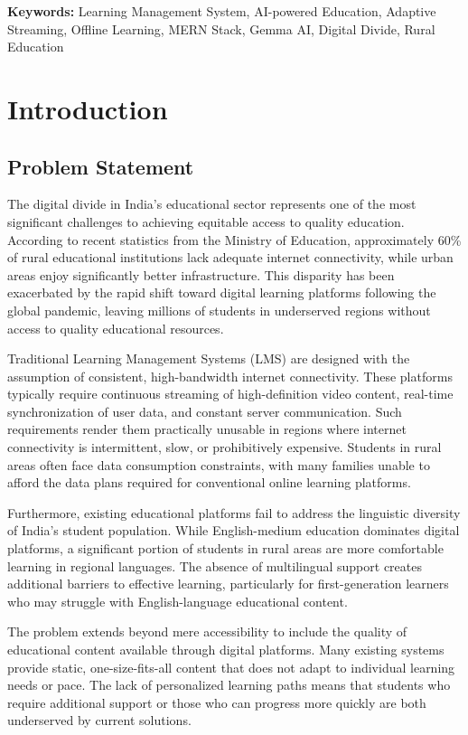 \documentclass[12pt,a4paper]{report}
\begin{document}
\textbf{Keywords:} Learning Management System, AI-powered Education, Adaptive Streaming, Offline Learning, MERN Stack, Gemma AI, Digital Divide, Rural Education

\newpage
\tableofcontents

\chapter{Introduction}

\section{Problem Statement}

The digital divide in India's educational sector represents one of the most significant challenges to achieving equitable access to quality education. According to recent statistics from the Ministry of Education, approximately 60\% of rural educational institutions lack adequate internet connectivity, while urban areas enjoy significantly better infrastructure. This disparity has been exacerbated by the rapid shift toward digital learning platforms following the global pandemic, leaving millions of students in underserved regions without access to quality educational resources.

Traditional Learning Management Systems (LMS) are designed with the assumption of consistent, high-bandwidth internet connectivity. These platforms typically require continuous streaming of high-definition video content, real-time synchronization of user data, and constant server communication. Such requirements render them practically unusable in regions where internet connectivity is intermittent, slow, or prohibitively expensive. Students in rural areas often face data consumption constraints, with many families unable to afford the data plans required for conventional online learning platforms.

Furthermore, existing educational platforms fail to address the linguistic diversity of India's student population. While English-medium education dominates digital platforms, a significant portion of students in rural areas are more comfortable learning in regional languages. The absence of multilingual support creates additional barriers to effective learning, particularly for first-generation learners who may struggle with English-language educational content.

The problem extends beyond mere accessibility to include the quality of educational content available through digital platforms. Many existing systems provide static, one-size-fits-all content that does not adapt to individual learning needs or pace. The lack of personalized learning paths means that students who require additional support or those who can progress more quickly are both underserved by current solutions.
\end{document}
